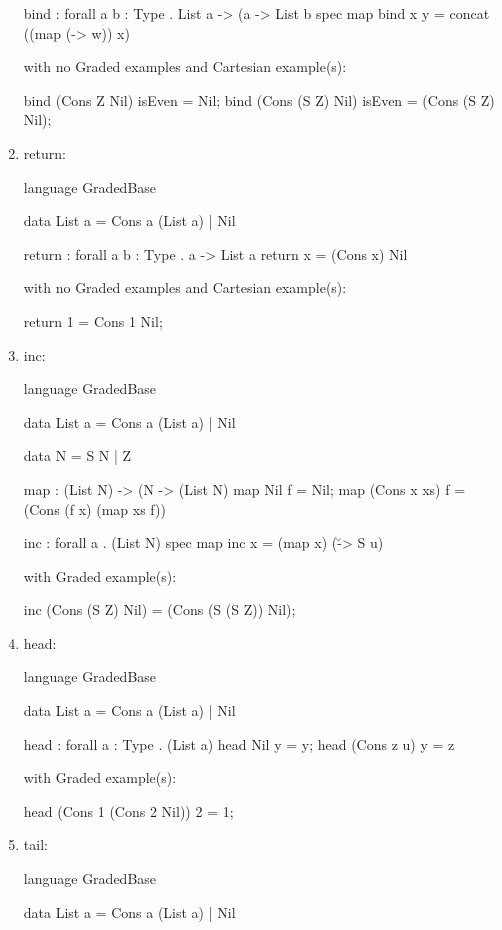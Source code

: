 \begin{enumerate}
\begin{granule}
bind : forall { a b : Type }
     . List a %
     -> (a %
     -> List b
spec 
    map %
bind x y = concat ((map (\w -> w)) x)
\end{granule}
with no Graded examples and Cartesian example(s):
\begin{granule}
bind (Cons Z Nil) isEven = Nil;
bind (Cons (S Z) Nil) isEven = (Cons (S Z) Nil);
\end{granule}
\item return: 
\begin{granule}
language GradedBase

data List a =  Cons a (List a) | Nil 

return : forall { a b : Type } . a -> List a
return x = (Cons x) Nil
\end{granule}
with no Graded examples and Cartesian example(s):
\begin{granule}
return 1 = Cons 1 Nil;
\end{granule}
\item inc: 
\begin{granule}
language GradedBase

data List a = Cons a (List a) | Nil
    
data N = S N | Z
    
map : (List N) %
    -> (N %
    -> (List N)
map Nil f = Nil; 
map (Cons x xs) f = (Cons (f x) (map xs f))
    
inc : forall a . (List N) %
spec
    map %
inc x = (map x) (\u -> S u)
\end{granule}
with Graded example(s):
\begin{granule}
inc (Cons (S Z) Nil) = (Cons (S (S Z)) Nil);
\end{granule}
\item head:
\begin{granule}
language GradedBase

data List a = Cons a (List a) | Nil 
    
head : forall { a : Type } . (List a) %
head Nil y = y;
head (Cons z u) y = z
\end{granule}
with Graded example(s):
\begin{granule}
head (Cons 1 (Cons 2 Nil)) 2 = 1;
\end{granule}
\item tail:
\begin{granule}
language GradedBase

data List a = Cons a (List a) | Nil 


\end{granule}
\end{enumerate}

